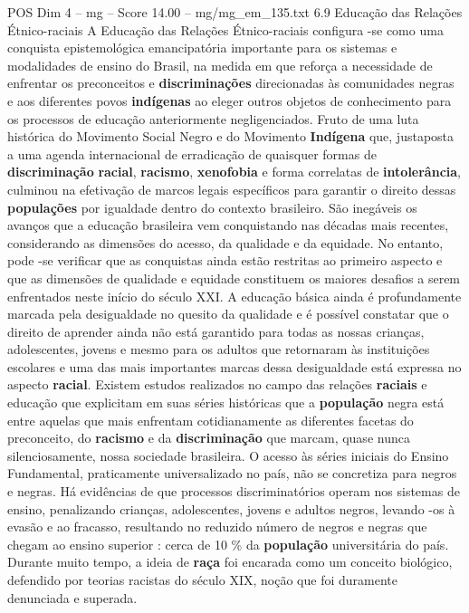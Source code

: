 \begin{textsample}{POS Dim 4 – mg – Score 14.00 – mg/mg\_em\_135.txt}  \label{ex:f4_pos_193}
6.9 Educação das Relações Étnico-raciais A Educação das Relações Étnico-raciais configura -se como uma conquista epistemológica emancipatória importante para os sistemas e modalidades de ensino do Brasil, na medida em que reforça a necessidade de enfrentar os preconceitos e \textbf{discriminações} direcionadas às comunidades negras e aos diferentes povos \textbf{indígenas} ao eleger outros objetos de conhecimento para os processos de educação anteriormente negligenciados.
Fruto de uma luta histórica do Movimento Social Negro e do Movimento \textbf{Indígena} que, justaposta a uma agenda internacional de erradicação de quaisquer formas de \textbf{discriminação} \textbf{racial}, \textbf{racismo}, \textbf{xenofobia} e forma correlatas de \textbf{intolerância}, culminou na efetivação de marcos legais específicos para garantir o direito dessas \textbf{populações} por igualdade dentro do contexto brasileiro.
São inegáveis os avanços que a educação brasileira vem conquistando nas décadas mais recentes, considerando as dimensões do acesso, da qualidade e da equidade.
No entanto, pode -se verificar que as conquistas ainda estão restritas ao primeiro aspecto e que as dimensões de qualidade e equidade constituem os maiores desafios a serem enfrentados neste início do século XXI.
A educação básica ainda é profundamente marcada pela desigualdade no quesito da qualidade e é possível constatar que o direito de aprender ainda não está garantido para todas as nossas crianças, adolescentes, jovens e mesmo para os adultos que retornaram às instituições escolares e uma das mais importantes marcas dessa desigualdade está expressa no aspecto \textbf{racial}.
Existem estudos realizados no campo das relações \textbf{raciais} e educação que explicitam em suas séries históricas que a \textbf{população} negra está entre aquelas que mais enfrentam cotidianamente as diferentes facetas do preconceito, do \textbf{racismo} e da \textbf{discriminação} que marcam, quase nunca silenciosamente, nossa sociedade brasileira.
O acesso às séries iniciais do Ensino Fundamental, praticamente universalizado no país, não se concretiza para negros e negras.
Há evidências de que processos discriminatórios operam nos sistemas de ensino, penalizando crianças, adolescentes, jovens e adultos negros, levando -os à evasão e ao fracasso, resultando no reduzido número de negros e negras que chegam ao ensino superior : cerca de 10 \% da \textbf{população} universitária do país.
Durante muito tempo, a ideia de \textbf{raça} foi encarada como um conceito biológico, defendido por teorias racistas do século XIX, noção que foi duramente denunciada e superada.

\end{textsample}
